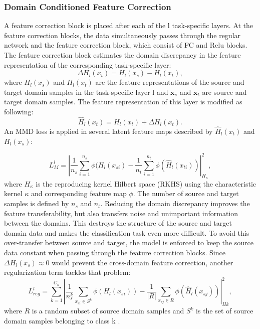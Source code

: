 \subsubsection{Domain Conditioned Feature Correction}
A feature correction block is placed after each of the l task-specific layers. At the feature correction blocks, the data simultaneously passes through the regular network and the feature correction block, which consist of FC and Relu blocks. The feature correction block estimates the domain discrepancy in the feature representation of the corresponding task-specific layer:
\begin{equation}
    \Delta H_{l}(x_{t}) = H_{l}(x_{s}) - H_{l}(x_{t}),
\end{equation}
where $H_{l}(x_{s})$ and $H_{l}(x_{t})$ are the feature representations of the source and target domain samples in the task-specific layer l and $\pmb{x}_{s}$ and $\pmb{x}_{t}$ are source and target domain samples. The feature representation of this layer is modified as following:
\begin{equation}
    \hat{H}_{l}(x_{t}) = H_{l}(x_{t}) + \Delta H_{l}(x_{t}).
\end{equation}
An MMD loss is applied in several latent feature maps described by $\hat{H}_{l}(x_{t})$ and $H_{l}(x_{s})$:

\begin{equation}
    L_{M}^{l} = |\frac{1}{n_s} \sum_{i=1}^{n_{s}} \phi(H_{l}(x_{si}) - \frac{1}{n_t} \sum_{i=1}^{n_{t}} \phi(\hat{H}_{l}(x_{ti}))|_{H_{\kappa}}^{2}, 
\end{equation}
where $H_{\kappa}$ is the reproducing kernel Hilbert space (RKHS) using the characteristic kernel $\kappa$ and corresponding feature map  $\phi$. The number of source and target samples is defined by $n_{s}$ and $n_{t}$. Reducing the domain discrepancy improves the feature transferability, but also transfers noise and unimportant information between the domains. This destroys the structure of the source and target domain data and makes the classification task even more difficult. To avoid this over-transfer between source and target, the model is enforced to keep the source data constant when passing through the feature correction blocks. Since $\Delta H_{l}(x_{s}) \approx 0$ would prevent the cross-domain feature correction, another regularization term tackles that problem:
\begin{equation}
    L_{reg}^{l} = \sum_{k=1}^{C_{n}}|\frac{1}{n_{s}^{k}} \sum_{x_{si} \in S^{k}} \phi(H_{l}(x_{si})) - \frac{1}{|R|} \sum_{x_{sj} \in R} \phi(\hat{H}_{l}(x_{sj}))|_{Hk}^{2}, 
\end{equation}
where $R$ is a random subset of source domain samples and $S^{k}$ is the set of source domain samples belonging to class k \cite{li2020}.

